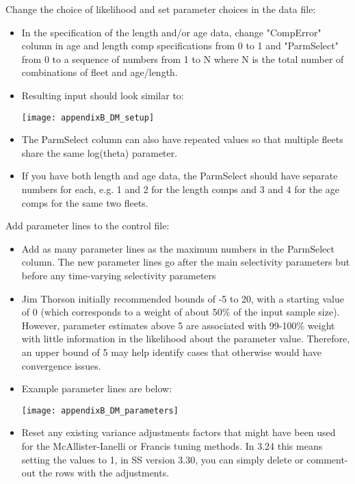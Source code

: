 Change the choice of likelihood and set parameter choices in the data file:

\begin{itemize}
	\item In the specification of the length and/or age data, change "CompError" column in age and length comp specifications from 0 to 1 and "ParmSelect" from 0 to a sequence of numbers from 1 to N where N is the total number of combinations of fleet and age/length.
	
	\item Resulting input should look similar to:
	\begin{center}
		\texttt{[image: appendixB\_DM\_setup]}\\
	\end{center}
	
	\item The ParmSelect column can also have repeated values so that multiple fleets share the same log(theta) parameter.
	
	\item If you have both length and age data, the ParmSelect should have separate numbers for each, e.g. 1 and 2 for the length comps and 3 and 4 for the age comps for the same two fleets.
	
\end{itemize}

Add parameter lines to the control file:

\begin{itemize}
	\item Add as many parameter lines as the maximum numbers in the ParmSelect column. The new parameter lines go after the main selectivity parameters but before any time-varying selectivity parameters
	
	\item Jim Thorson initially recommended bounds of -5 to 20, with a starting value of 0
	(which corresponds to a weight of about 50\% of the input sample size). However, parameter estimates above 5 are associated with 99-100\% weight with little information in the likelihood about the parameter value. Therefore, an upper bound of 5 may help identify cases that otherwise would have convergence issues.
	
	\item Example parameter lines are below: 
		\begin{center}
			\texttt{[image: appendixB\_DM\_parameters]}\\
		\end{center}
	
	\item Reset any existing variance adjustments factors that might have been used for the McAllister-Ianelli or Francis tuning methods. In 3.24 this means setting the values to 1, in SS version 3.30, you can simply delete or comment-out the rows with the adjustments.
\end{itemize}

